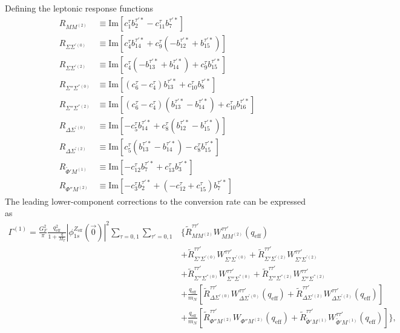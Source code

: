 \documentclass{book}[letterpaper,12pt]
\begin{document}
Defining the leptonic response functions
\begin{equation}
\begin{split}
R_{MM^{(2)}}&\equiv \mathrm{Im}\left[c_1^{\tau}b_2^{\tau'*}-c_{11}^{\tau}b_7^{\tau'*}\right]\\
R_{\Sigma\Sigma^{'(0)}}&\equiv \mathrm{Im}\left[c_4^{\tau}b_{14}^{\tau'*}+c_9^{\tau}(-b_{12}^{\tau'*}+b_{15}^{\tau'*})\right]\\
R_{\Sigma\Sigma^{'(2)}}&\equiv \mathrm{Im}\left[c_4^{\tau}(-b_{13}^{\tau'*}+b_{14}^{\tau'*})+c_9^{\tau}b_{15}^{\tau'*}\right]\\
R_{\Sigma''\Sigma^{''(0)}}&\equiv \mathrm{Im}\left[(c_6^{\tau}-c_4^{\tau})b_{13}^{\tau'*}+c_{10}^{\tau}b_8^{\tau'*}\right]\\
R_{\Sigma''\Sigma^{''(2)}}&\equiv\mathrm{Im}\left[(c_6^{\tau}-c_4^{\tau})(b_{13}^{\tau'*}-b_{14}^{\tau'*})+c_{10}^{\tau}b_{16}^{\tau'*}\right]\\
R_{\Delta\Sigma^{'(0)}}&\equiv \mathrm{Im}\left[-c_5^{\tau}b_{14}^{\tau'*}+c_8^{\tau}(b_{12}^{\tau'*}-b_{15}^{\tau'*})\right]\\
R_{\Delta\Sigma^{'(2)}}&\equiv \mathrm{Im}\left[c_5^{\tau}(b_{13}^{\tau'*}-b_{14}^{\tau'*})-c_8^{\tau}b_{15}^{\tau'*}\right]\\
R_{\tilde{\Phi}'M^{(1)}}&\equiv \mathrm{Im}\left[-c_{12}^{\tau}b_7^{\tau'*}+c_{13}^{\tau}b_3^{\tau'*}\right]\\
R_{\Phi''M^{(2)}}&\equiv \mathrm{Im}\left[-c_3^{\tau}b_2^{\tau'*}+(-c_{12}^{\tau}+c_{15}^{\tau})b_7^{\tau'*}\right]
\end{split}
\end{equation}
The leading lower-component corrections to the conversion rate can be expressed as
\begin{equation}
\begin{split}
\Gamma^{(1)}=\frac{G_F^2}{\pi}\frac{q_\mathrm{eff}^2}{1+\frac{q}{M_T}}|\phi_{1s}^{Z_\mathrm{eff}}(\vec{0})|^2\sum_{\tau=0,1}\sum_{\tau'=0,1}&\Bigg\{\tilde{R}_{MM^{(2)}}^{\tau\tau'}W_{MM^{(2)}}^{\tau\tau'}(q_\mathrm{eff})\\
&+\tilde{R}_{\Sigma'\Sigma^{'(0)}}^{\tau\tau'}W_{\Sigma'\Sigma^{'(0)}}^{\tau\tau'}+\tilde{R}_{\Sigma'\Sigma^{'(2)}}^{\tau\tau'}W_{\Sigma'\Sigma^{'(2)}}^{\tau\tau'}\\
&+\tilde{R}_{\Sigma''\Sigma^{''(0)}}^{\tau\tau'}W_{\Sigma''\Sigma^{''(0)}}^{\tau\tau'}+\tilde{R}_{\Sigma''\Sigma^{''(2)}}^{\tau\tau'}W_{\Sigma''\Sigma^{''(2)}}^{\tau\tau'}\\
&+\frac{q_\mathrm{eff}}{m_N}\left[\tilde{R}_{\Delta\Sigma^{'(0)}}^{\tau\tau'}W_{\Delta\Sigma^{'(0)}}^{\tau\tau'}(q_\mathrm{eff})+\tilde{R}_{\Delta\Sigma^{'(2)}}^{\tau\tau'}W_{\Delta\Sigma^{'(2)}}^{\tau\tau'}(q_\mathrm{eff})\right]\\
&+\frac{q_\mathrm{eff}}{m_N}\left[\tilde{R}_{\Phi''M^{(2)}}^{\tau\tau'}W_{\Phi''M^{(2)}}(q_\mathrm{eff})+\tilde{R}_{\tilde{\Phi}'M^{(1)}}^{\tau\tau'}W_{\tilde{\Phi}'M^{(1)}}^{\tau\tau'}(q_\mathrm{eff})\right]\Bigg\},
\end{split}
\end{equation}
\end{document}
